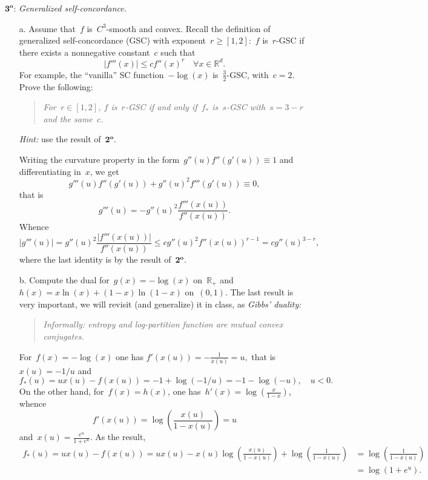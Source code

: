 \documentclass[11pt]{article}
\newcommand{\proofstep}[1]{$\boldsymbol{{#1}^o}$}
\newcommand{\odima}[1]{{\color{red} #1}}
\newcommand{\R}{\mathds{R}}
\newcommand{\leqs}{\leqslant}
\newcommand{\geqs}{\geqslant}
\renewcommand{\le}{\leqs}
\renewcommand{\ge}{\geqs}
\begin{document}
\noindent
\proofstep{3}: {\em Generalized self-concordance.}

\begin{itemize}
\item[a.]
Assume that~$f$ is~$C^3$-smooth and convex.
Recall the definition of generalized self-concordance (GSC) with exponent~$r \ge [1,2]$:~$f$ is~$r$-GSC if there exists a nonnegative constant~$c$ such that
\[
|f'''(x)| \le c f''(x)^r \quad \forall x \in \R^d.
\]
For example, the ``vanilla'' SC function~$-\log(x)$ is~$\frac{3}{2}$-GSC, with~$c = 2$. 
Prove the following: 
\begin{quote}
{\em For~$r \in [1,2]$, $f$ is~$r$-GSC if and only if~$f_*$ is~$s$-GSC with~$s = 3-r$ and the same~$c$.}
\end{quote}
{\em Hint:} use the result of~\proofstep{2}.

\odima{Writing the curvature property in the form~$g''(u) f''(g'(u))  \equiv 1$ and differentiating in~$x$, we get
\[
g'''(u) f''(g'(u)) + g''(u)^2 f'''(g'(u)) \equiv 0,
\]
that is
\[
g'''(u) = -g''(u)^2 \frac{f'''(x(u))}{f''(x(u))}.
\]
Whence
\[
|g'''(u)| 
= g''(u)^2 \frac{|f'''(x(u))|}{f''(x(u))} 
\le cg''(u)^2 f''(x(u))^{r-1}
= cg''(u)^{3-r},
\]
where the last identity is by the result of~\proofstep{2}.
}
\item[b.]
Compute the dual for~$g(x) = -\log(x)$ on~$\R_+$ and~$h(x) = x\ln(x) + (1-x)\ln(1-x)$ on~$(0,1)$.
The last result is very important, we will revisit (and generalize) it in class, as {\em Gibbs' duality:}

\begin{quote}
\em 
Informally: entropy and log-partition function are mutual convex conjugates.
\em
\end{quote}

\noindent
\odima{
For~$f(x) = -\log(x)$ one has
$
f'(x(u)) = -\frac{1}{x(u)} = u,
$
that is~$x(u) = -1/u$ and
\[
f_*(u) = u x(u) - f(x(u)) = -1 + \log(-1/u) = -1 - \log(-u), \quad u  < 0.
\]
On the other hand, for~$f(x) = h(x)$, one has~$h'(x) = \log(\frac{x}{1-x})$, whence
\[
f'(x(u)) = \log\left(\frac{x(u)}{1-x(u)}\right) = u
\]
and~$x(u) = \frac{e^{u}}{1+e^{u}}$. 
As the result,
\[
\begin{aligned}
f_*(u) = u x(u) - f(x(u)) 
= u x(u) - x(u)\log \left( \frac{x(u)}{1-x(u)} \right) + \log\left( \frac{1}{1-x(u)} \right) 
&= \log\left( \frac{1}{1-x(u)} \right)  \\
&= \log(1+e^{u}).
\end{aligned}
\]
}
\end{itemize}
\end{document}
